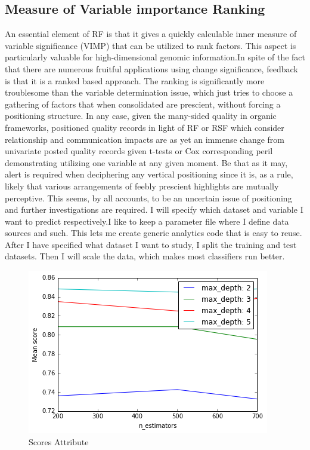\documentclass[sigconf]{acmart}
\begin{document}
\subsection{Measure of Variable importance Ranking}
An essential element of RF is that it gives a quickly calculable inner measure of variable significance (VIMP) that can be utilized to rank factors. This aspect is particularly valuable for high-dimensional genomic information.In spite of the fact that there are numerous fruitful applications using change significance, feedback is that it is a ranked based approach. The ranking is significantly more troublesome than the variable determination issue, which just tries to choose a gathering of factors that when consolidated are prescient, without forcing a positioning structure. In any case, given the many-sided quality in organic frameworks, positioned quality records in light of RF or RSF which consider relationship and communication impacts are as yet an immense change from univariate posted quality records given t-tests or Cox corresponding peril demonstrating utilizing one variable at any given moment. Be that as it may, alert is required when deciphering any vertical positioning since it is, as a rule, likely that various arrangements of feebly prescient highlights are mutually perceptive. This seems, by all accounts, to be an uncertain issue of positioning and further investigations are required.
I will specify which dataset and variable I want to predict respectively.I like to keep a parameter file where I define data sources and such. This lets me create generic analytics code that is easy to reuse. After I have specified what dataset I want to study, I split the training and test datasets. Then I will scale the data, which makes most classifiers run better.

\begin{figure}
    \centering
    \includegraphics[width=1.0\columnwidth]{images/output_15_1.png}
    \caption{Scores Attribute}
    \label{Score}
\end{figure}
\end{document}
